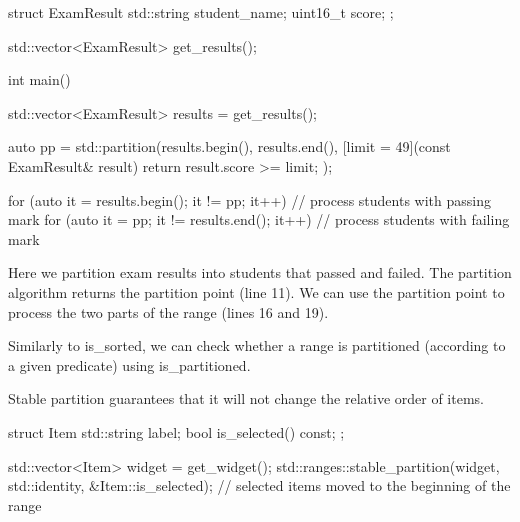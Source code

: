 \begin{box-note}
\begin{cppcode}
struct ExamResult {
    std::string student_name;
    uint16_t score;
};

std::vector<ExamResult> get_results();

int main() {
    std::vector<ExamResult> results = get_results();
  
    auto pp = std::partition(results.begin(), results.end(), 
        [limit = 49](const ExamResult& result) {
            return result.score >= limit;
        });
 
    for (auto it = results.begin(); it != pp; it++) {
        // process students with passing mark
    }
    for (auto it = pp; it != results.end(); it++) {
        // process students with failing mark
     }
}
\end{cppcode}
\end{box-note}

Here we partition exam results into students that passed and failed. The partition algorithm returns the partition point (line 11). We can use the partition point to process the two parts of the range (lines 16 and 19).

Similarly to is\_sorted, we can check whether a range is partitioned (according to a given predicate) using is\_partitioned.



\begin{box-note}
\end{box-note}

Stable partition guarantees that it will not change the relative order of items.



\begin{box-note}
\begin{cppcode}
struct Item {
    std::string label;
    bool is_selected() const;
};

std::vector<Item> widget = get_widget();
std::ranges::stable_partition(widget, std::identity{}, &Item::is_selected);
// selected items moved to the beginning of the range
\end{cppcode}
\end{box-note}

